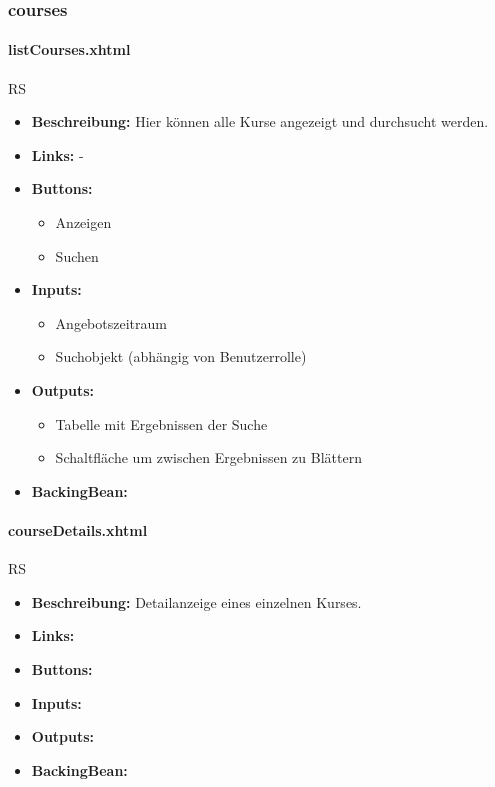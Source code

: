 			\subsubsection{courses}
				
				\paragraph{listCourses.xhtml}
					RS\\
					\begin{itemize}
						\item \textbf{Beschreibung:} Hier können alle Kurse angezeigt und durchsucht werden.
						\item \textbf{Links:} -
						\item \textbf{Buttons:}
							\begin{itemize}
								\item Anzeigen
								\item Suchen
							\end{itemize}
						\item \textbf{Inputs:}
							\begin{itemize}
								\item Angebotszeitraum
								\item Suchobjekt (abhängig von Benutzerrolle)
							\end{itemize}
						\item \textbf{Outputs:}
							\begin{itemize}
								\item Tabelle mit Ergebnissen der Suche
								\item Schaltfläche um zwischen Ergebnissen zu Blättern
							\end{itemize}
						\item \textbf{BackingBean:}
					\end{itemize}
				
				\paragraph{courseDetails.xhtml}
					RS\\
					\begin{itemize}
						\item \textbf{Beschreibung:} Detailanzeige eines einzelnen Kurses.
						\item \textbf{Links:}
						\item \textbf{Buttons:}
						\item \textbf{Inputs:}
						\item \textbf{Outputs:}
						\item \textbf{BackingBean:}
					\end{itemize}
		
